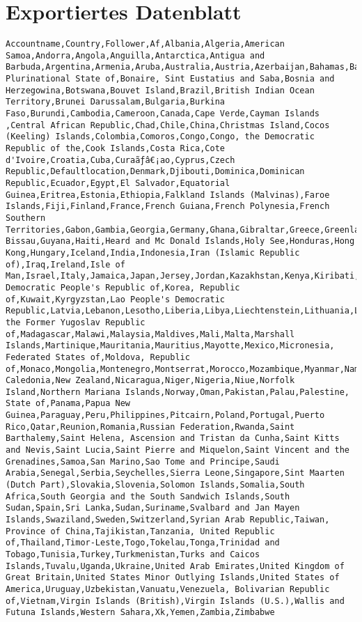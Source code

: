 \section{Exportiertes Datenblatt}
\begin{lstlisting}
Accountname,Country,Follower,Af,Albania,Algeria,American Samoa,Andorra,Angola,Anguilla,Antarctica,Antigua and Barbuda,Argentina,Armenia,Aruba,Australia,Austria,Azerbaijan,Bahamas,Bahrain,Bangladesh,Barbados,Belarus,Belgium,Belize,Benin,Bermuda,Bhutan,Bolivia, Plurinational State of,Bonaire, Sint Eustatius and Saba,Bosnia and Herzegowina,Botswana,Bouvet Island,Brazil,British Indian Ocean Territory,Brunei Darussalam,Bulgaria,Burkina Faso,Burundi,Cambodia,Cameroon,Canada,Cape Verde,Cayman Islands ,Central African Republic,Chad,Chile,China,Christmas Island,Cocos (Keeling) Islands,Colombia,Comoros,Congo,Congo, the Democratic Republic of the,Cook Islands,Costa Rica,Cote d'Ivoire,Croatia,Cuba,Curaãƒâ€¡ao,Cyprus,Czech Republic,Defaultlocation,Denmark,Djibouti,Dominica,Dominican Republic,Ecuador,Egypt,El Salvador,Equatorial Guinea,Eritrea,Estonia,Ethiopia,Falkland Islands (Malvinas),Faroe Islands,Fiji,Finland,France,French Guiana,French Polynesia,French Southern Territories,Gabon,Gambia,Georgia,Germany,Ghana,Gibraltar,Greece,Greenland,Grenada,Guadeloupe,Guam,Guatemala,Guernsey,Guinea,Guinea-Bissau,Guyana,Haiti,Heard and Mc Donald Islands,Holy See,Honduras,Hong Kong,Hungary,Iceland,India,Indonesia,Iran (Islamic Republic of),Iraq,Ireland,Isle of Man,Israel,Italy,Jamaica,Japan,Jersey,Jordan,Kazakhstan,Kenya,Kiribati,Korea, Democratic People's Republic of,Korea, Republic of,Kuwait,Kyrgyzstan,Lao People's Democratic Republic,Latvia,Lebanon,Lesotho,Liberia,Libya,Liechtenstein,Lithuania,Luxembourg,Macao,Macedonia, the Former Yugoslav Republic of,Madagascar,Malawi,Malaysia,Maldives,Mali,Malta,Marshall Islands,Martinique,Mauritania,Mauritius,Mayotte,Mexico,Micronesia, Federated States of,Moldova, Republic of,Monaco,Mongolia,Montenegro,Montserrat,Morocco,Mozambique,Myanmar,Namibia,Nauru,Nepal,Netherlands,New Caledonia,New Zealand,Nicaragua,Niger,Nigeria,Niue,Norfolk Island,Northern Mariana Islands,Norway,Oman,Pakistan,Palau,Palestine, State of,Panama,Papua New Guinea,Paraguay,Peru,Philippines,Pitcairn,Poland,Portugal,Puerto Rico,Qatar,Reunion,Romania,Russian Federation,Rwanda,Saint Barthalemy,Saint Helena, Ascension and Tristan da Cunha,Saint Kitts and Nevis,Saint Lucia,Saint Pierre and Miquelon,Saint Vincent and the Grenadines,Samoa,San Marino,Sao Tome and Principe,Saudi Arabia,Senegal,Serbia,Seychelles,Sierra Leone,Singapore,Sint Maarten (Dutch Part),Slovakia,Slovenia,Solomon Islands,Somalia,South Africa,South Georgia and the South Sandwich Islands,South Sudan,Spain,Sri Lanka,Sudan,Suriname,Svalbard and Jan Mayen Islands,Swaziland,Sweden,Switzerland,Syrian Arab Republic,Taiwan, Province of China,Tajikistan,Tanzania, United Republic of,Thailand,Timor-Leste,Togo,Tokelau,Tonga,Trinidad and Tobago,Tunisia,Turkey,Turkmenistan,Turks and Caicos Islands,Tuvalu,Uganda,Ukraine,United Arab Emirates,United Kingdom of Great Britain,United States Minor Outlying Islands,United States of America,Uruguay,Uzbekistan,Vanuatu,Venezuela, Bolivarian Republic of,Vietnam,Virgin Islands (British),Virgin Islands (U.S.),Wallis and Futuna Islands,Western Sahara,Xk,Yemen,Zambia,Zimbabwe

\end{lstlisting}
